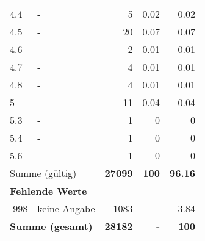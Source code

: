 \begin{longtable}{lXrrr}
        4.4 & \multicolumn{1}{X}{-} & %
          \num{5} &
          \num[round-mode=places,round-precision=2]{0,02} &
          \num[round-mode=places,round-precision=2]{0,02} \\

        4.5 & \multicolumn{1}{X}{-} & %
          \num{20} &
          \num[round-mode=places,round-precision=2]{0,07} &
          \num[round-mode=places,round-precision=2]{0,07} \\

        4.6 & \multicolumn{1}{X}{-} & %
          \num{2} &
          \num[round-mode=places,round-precision=2]{0,01} &
          \num[round-mode=places,round-precision=2]{0,01} \\

        4.7 & \multicolumn{1}{X}{-} & %
          \num{4} &
          \num[round-mode=places,round-precision=2]{0,01} &
          \num[round-mode=places,round-precision=2]{0,01} \\

        4.8 & \multicolumn{1}{X}{-} & %
          \num{4} &
          \num[round-mode=places,round-precision=2]{0,01} &
          \num[round-mode=places,round-precision=2]{0,01} \\

        5 & \multicolumn{1}{X}{-} & %
          \num{11} &
          \num[round-mode=places,round-precision=2]{0,04} &
          \num[round-mode=places,round-precision=2]{0,04} \\

        5.3 & \multicolumn{1}{X}{-} & %
          \num{1} &
          \num[round-mode=places,round-precision=2]{0} &
          \num[round-mode=places,round-precision=2]{0} \\

        5.4 & \multicolumn{1}{X}{-} & %
          \num{1} &
          \num[round-mode=places,round-precision=2]{0} &
          \num[round-mode=places,round-precision=2]{0} \\

        5.6 & \multicolumn{1}{X}{-} & %
          \num{1} &
          \num[round-mode=places,round-precision=2]{0} &
          \num[round-mode=places,round-precision=2]{0} \\

     \midrule
     \multicolumn{2}{l}{Summe (gültig)} &
       \textbf{\num{27099}} &
     \textbf{100} &
       \textbf{\num[round-mode=places,round-precision=2]{96,16}} \\
     \multicolumn{5}{l}{\textbf{Fehlende Werte}}\\
       -998 &
       keine Angabe &
         \num{1083} &
        - &
         \num[round-mode=places,round-precision=2]{3,84} \\
     \midrule
     \multicolumn{2}{l}{\textbf{Summe (gesamt)}} &
          \textbf{\num{28182}} &
        \textbf{-} &
        \textbf{100} \\
     \bottomrule
     \end{longtable}
     
